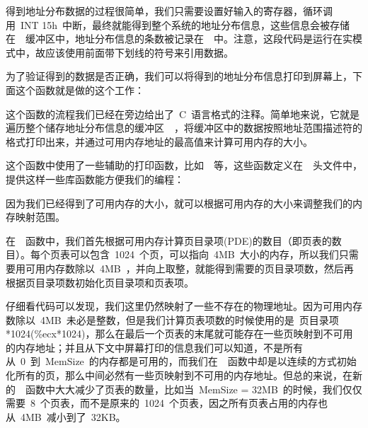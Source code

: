 得到地址分布数据的过程很简单，我们只需要设置好输入的寄存器，循环调用~INT 15h~中断，最终就能得到整个系统的地址分布信息，这些信息会被存储在~~缓冲区中，地址分布信息的条数被记录在~~中。注意，这段代码是运行在实模式中，故应该使用前面带下划线的符号来引用数据。

为了验证得到的数据是否正确，我们可以将得到的地址分布信息打印到屏幕上，下面这个函数就是做的这个工作：


这个函数的流程我们已经在旁边给出了~C~语言格式的注释。简单地来说，它就是遍历整个储存地址分布信息的缓冲区~~，将缓冲区中的数据按照地址范围描述符的格式打印出来，并通过可用内存地址的最高值来计算可用内存的大小。

这个函数中使用了一些辅助的打印函数，比如~~等，这些函数定义在~~头文件中，提供这样一些库函数能方便我们的编程：


因为我们已经得到了可用内存的大小，就可以根据可用内存的大小来调整我们的内存映射范围。


在~~函数中，我们首先根据可用内存计算页目录项(PDE)的数目（即页表的数目）。每个页表可以包含~1024~个页，可以指向~4MB~大小的内存，所以我们只需要用可用内存数除以~4MB~，并向上取整，就能得到需要的页目录项数，然后再根据页目录项数初始化页目录项和页表项。

仔细看代码可以发现，我们这里仍然映射了一些不存在的物理地址。因为可用内存数除以~4MB~未必是整数，但是我们计算页表项数的时候使用的是~页目录项*1024(\%ecx*1024)，那么在最后一个页表的末尾就可能存在一些页映射到不可用的内存地址；并且从下文中屏幕打印的信息我们可以知道，不是所有从~0~到~MemSize~的内存都是可用的，而我们在~~函数中却是以连续的方式初始化所有的页，那么中间必然有一些页映射到不可用的内存地址。但总的来说，在新的~~函数中大大减少了页表的数量，比如当~MemSize = 32MB~的时候，我们仅仅需要~8~个页表，而不是原来的~1024~个页表，因之所有页表占用的内存也从~4MB~减小到了~32KB。

